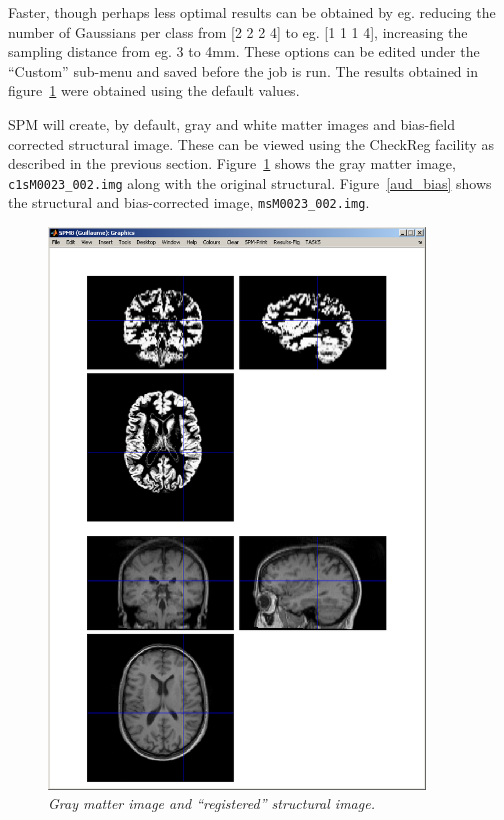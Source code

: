 Faster, though perhaps less optimal results can be obtained by eg. reducing the number of Gaussians per class from [2 2 2 4] to eg. [1 1 1 4], increasing the sampling distance from eg. 3 to 4mm. These options can be edited under the ``Custom'' sub-menu and saved before the job is run. The results obtained in figure~\ref{aud_gray} were obtained using the default values.

SPM will create, by default, gray and white matter images and bias-field corrected structural image. These can be viewed using the CheckReg facility as described in the previous section. Figure~\ref{aud_gray} shows the gray matter image, \texttt{c1sM0023\_002.img} along with the original structural. Figure~\ref{aud_bias} shows the structural and bias-corrected image, \texttt{msM0023\_002.img}.

\begin{figure}
\begin{center}
\includegraphics[width=100mm]{auditory/gray}
\caption{\em Gray matter image and ``registered'' structural image.\label{aud_gray}}
\end{center}
\end{figure}

